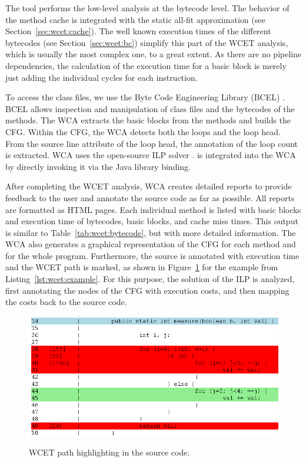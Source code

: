 The tool performs the low-level analysis at the bytecode level. The
behavior of the method cache is integrated with the static all-fit
approximation (see Section~\ref{sec:wcet:cache}). The well known
execution times of the different bytecodes (see
Section~\ref{sec:wcet:bc}) simplify this part of the WCET analysis,
which is usually the most complex one, to a great extent. As there
are no pipeline dependencies, the calculation of the execution time
for a basic block is merely just adding the individual cycles for
each instruction.

To access the class files, we use the Byte Code Engineering Library
(BCEL) \cite{gc:bcel}. BCEL allows inspection and manipulation of
class files and the bytecodes of the methods. The WCA extracts the
basic blocks from the methods and builds the CFG. Within the CFG, the
WCA detects both the loops and the loop head. From the source line
attribute of the loop head, the annotation of the loop count is
extracted. WCA uses the open-source ILP solver .
 is integrated into the WCA by directly invoking it
via the Java library binding.

After completing the WCET analysis, WCA creates detailed reports to
provide feedback to the user and annotate the source code as far as
possible. All reports are formatted as HTML pages. Each individual
method is listed with basic blocks and execution time of bytecodes,
basic blocks, and cache miss times. This output is similar to
Table~\ref{tab:wcet:bytecode}, but with more detailed information.
The WCA also generates a graphical representation of the CFG for each
method and for the whole program. Furthermore, the source is
annotated with execution time and the WCET path is marked, as shown
in Figure~\ref{fig:report} for the example from
Listing~\ref{lst:wcet:example}. For this purpose, the solution of the
ILP is analyzed, first annotating the nodes of the CFG with execution
costs, and then mapping the costs back to the source code.


\begin{figure}[t]
  \centering
  \includegraphics[scale=0.5]{wcet/html}\\
  \caption{WCET path highlighting in the source code.}\label{fig:report}
\end{figure}

